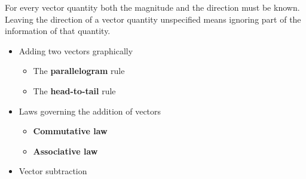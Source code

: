 \begin{ELremark}{}

For every vector quantity both the magnitude and the direction must be known. Leaving the direction of a vector quantity unspecified means ignoring part of the information of that quantity.

\end{ELremark}

\ELhold


\begin{ELunit}

\begin{itemize}
\tightlist
\item
  Adding two vectors graphically

  \begin{itemize}
  \tightlist
  \item
    The \textbf{parallelogram} rule
  \item
    The \textbf{head-to-tail} rule
  \end{itemize}
\end{itemize}


\begin{itemize}
\tightlist
\item
  Laws governing the addition of vectors

  \begin{itemize}
  \item
    \textbf{Commutative law}
  \item
    \textbf{Associative law}
  \end{itemize}
\end{itemize}

\end{ELunit}

\ELhold


\begin{ELunit}

\begin{itemize}
\tightlist
\item
  Vector subtraction
\end{itemize}



\end{ELunit}

